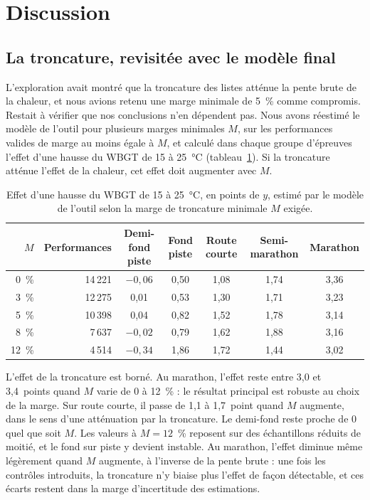 \documentclass[11pt,a4paper]{article}
\begin{document}
\section{Discussion}\label{sec:discussion}

\subsection{La troncature, revisitée avec le modèle final}\label{sec:sensibilite}

L'exploration avait montré que la troncature des listes atténue la pente brute de la chaleur, et nous avions retenu
une marge minimale de 5~\% comme compromis. Restait à vérifier que nos conclusions n'en dépendent pas. Nous avons
réestimé le modèle de l'outil pour plusieurs marges minimales $M$, sur les performances valides de marge au moins égale
à $M$, et calculé dans chaque groupe d'épreuves l'effet d'une hausse du WBGT de 15 à 25~°C (tableau~\ref{tab:marges}).
Si la troncature atténue l'effet de la chaleur, cet effet doit augmenter avec $M$.

\begin{table}[htbp]
\centering
\small
\caption{Effet d'une hausse du WBGT de 15 à 25~°C, en points de $y$, estimé par le modèle de l'outil selon la marge
de troncature minimale $M$ exigée.}
\label{tab:marges}
\begin{tabular}{@{}rrccccc@{}}
\toprule
$M$ & Performances & Demi-fond piste & Fond piste & Route courte & Semi-marathon & Marathon \\
\midrule
0~\% & 14\,221 & $-0{,}06$ & 0,50 & 1,08 & 1,74 & 3,36 \\
3~\% & 12\,275 & 0,01 & 0,53 & 1,30 & 1,71 & 3,23 \\
5~\% & 10\,398 & 0,04 & 0,82 & 1,52 & 1,78 & 3,14 \\
8~\% & 7\,637 & $-0{,}02$ & 0,79 & 1,62 & 1,88 & 3,16 \\
12~\% & 4\,514 & $-0{,}34$ & 1,86 & 1,72 & 1,44 & 3,02 \\
\bottomrule
\end{tabular}
\end{table}

L'effet de la troncature est borné. Au marathon, l'effet reste entre 3,0 et 3,4~points quand $M$ varie de 0 à 12~\% :
le résultat principal est robuste au choix de la marge. Sur route courte, il passe de 1,1 à 1,7~point quand $M$
augmente, dans le sens d'une atténuation par la troncature. Le demi-fond reste proche de 0 quel que soit $M$. Les
valeurs à $M = 12$~\% reposent sur des échantillons réduits de moitié, et le fond sur piste y devient instable. Au
marathon, l'effet diminue même légèrement quand $M$ augmente, à l'inverse de la pente brute : une fois les contrôles
introduits, la troncature n'y biaise plus l'effet de façon détectable, et ces écarts restent dans la marge
d'incertitude des estimations.
\end{document}
